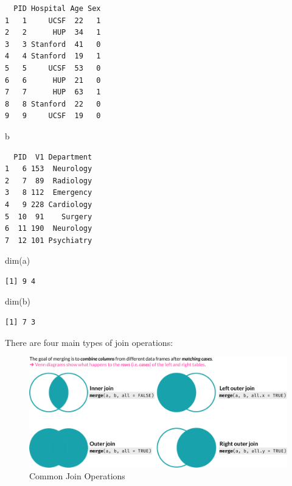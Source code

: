 \documentclass[
]{book}
\newenvironment{Shaded}{\begin{snugshade}}{\end{snugshade}}
\newcommand{\FunctionTok}[1]{\textcolor[rgb]{0.00,0.00,0.00}{#1}}
\newcommand{\NormalTok}[1]{#1}
\begin{document}
\begin{verbatim}
  PID Hospital Age Sex
1   1     UCSF  22   1
2   2      HUP  34   1
3   3 Stanford  41   0
4   4 Stanford  19   1
5   5     UCSF  53   0
6   6      HUP  21   0
7   7      HUP  63   1
8   8 Stanford  22   0
9   9     UCSF  19   0
\end{verbatim}

\begin{Shaded}
\begin{Highlighting}[]
\NormalTok{b}
\end{Highlighting}
\end{Shaded}

\begin{verbatim}
  PID  V1 Department
1   6 153  Neurology
2   7  89  Radiology
3   8 112  Emergency
4   9 228 Cardiology
5  10  91    Surgery
6  11 190  Neurology
7  12 101 Psychiatry
\end{verbatim}

\begin{Shaded}
\begin{Highlighting}[]
\FunctionTok{dim}\NormalTok{(a)}
\end{Highlighting}
\end{Shaded}

\begin{verbatim}
[1] 9 4
\end{verbatim}

\begin{Shaded}
\begin{Highlighting}[]
\FunctionTok{dim}\NormalTok{(b)}
\end{Highlighting}
\end{Shaded}

\begin{verbatim}
[1] 7 3
\end{verbatim}

There are four main types of join operations:

\begin{figure}

{\centering \includegraphics[width=1\linewidth]{R_joins} 

}

\caption{Common Join Operations}\label{fig:unnamed-chunk-8}
\end{figure}
\end{document}
